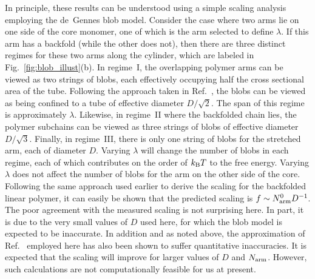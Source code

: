 \documentclass[journal=mamobx,manuscript=article,layout=twocolumn]{achemso}
\begin{document}
In principle, these results can be understood using a simple scaling analysis employing 
the de~Gennes blob model. Consider the case where two arms lie on one side of the
core monomer, one of which is the arm selected to define $\lambda$. If this arm
has a backfold (while the other does not), then there are three distinct regimes 
for these two arms along the cylinder, which are labeled in Fig.~\ref{fig:blob_illust}(b).
In regime~I, the overlapping polymer arms can be viewed as two strings of blobs,
each effectively occupying half the cross sectional area of the tube. Following
the approach taken in Ref.~, the blobs can be viewed
as being confined to a tube of effective diameter $D/\sqrt{2}$. The span of this
regime is approximately $\lambda$. Likewise, in regime~II where the backfolded chain 
lies, the polymer subchains can be viewed as three strings of blobs of effective 
diameter $D/\sqrt{3}$. Finally, in regime~III, there is only one string of blobs
for the stretched arm, each of diameter $D$. Varying $\lambda$ will change the
number of blobs in each regime, each of which contributes on the order of $k_{\rm B}T$
to the free energy. Varying $\lambda$ does not affect the number of blobs for the
arm on the other side of the core. Following the same approach used earlier to
derive the scaling for the backfolded linear polymer, it can easily be shown
that the predicted scaling is $f \sim N_{\rm arm}^0 D^{-1}$. The poor agreement
with the measured scaling is not surprising here. In part, it is due to the very
small values of $D$ used here, for which the blob model is expected to be inaccurate.
In addition and as noted above, the approximation of Ref.~ employed here
has also been shown to suffer quantitative inaccuracies.\cite{polson2017segregation}
It is expected that the scaling will improve for larger values of $D$ and $N_{\rm arm}$.
However, such calculations are not computationally feasible for us at present.
\end{document}

